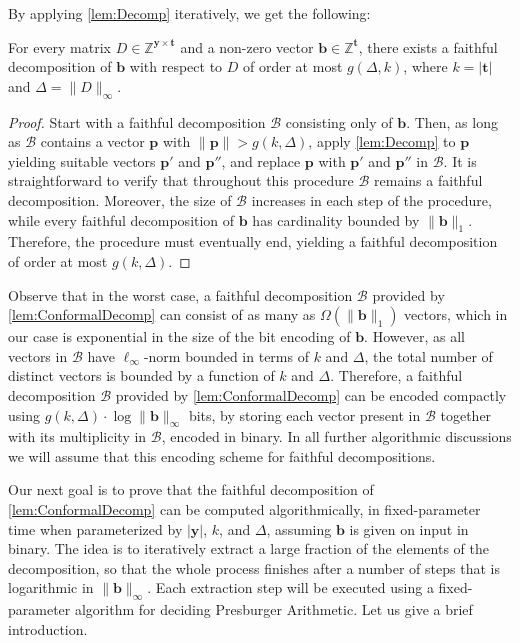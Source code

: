 \documentclass{article}
\newcommand{\Bb}{\mathcal{B}}
\newcommand{\Z}{\mathbb{Z}}
\newcommand{\tup}[1]{{\mathbf{#1}}}
\newcommand{\yy}{\tup y}
\newcommand{\tv}{\tup t}
\newcommand{\bb}{\tup b}
\newcommand{\pp}{\tup p}
\newcommand{\matrices}[3]{#1^{#2\times #3}}
\begin{document}
By applying \cref{lem:Decomp} iteratively, we get the following:

\begin{lemma}\label{lem:ConformalDecomp}
For every matrix $D\in \matrices{\Z}{\yy}{\tv}$ and a non-zero vector $\bb\in \Z^{\tv}$, there exists a faithful decomposition of $\bb$ with respect to $D$ of order at most $g(\Delta,k)$, where $k=|\tv|$ and $\Delta=\|D\|_\infty$.
\end{lemma}
\begin{proof}
Start with a faithful decomposition $\Bb$ consisting only of $\bb$. Then, as long as $\Bb$ contains a vector $\pp$ with $\|\pp\|>g(k,\Delta)$, apply \cref{lem:Decomp} to $\pp$ yielding suitable vectors $\pp'$ and $\pp''$, and replace $\pp$ with $\pp'$ and $\pp''$ in $\Bb$. It is straightforward to verify that throughout this procedure $\Bb$ remains a faithful decomposition. Moreover, the size of $\Bb$ increases in each step of the procedure, while every faithful decomposition of $\bb$ has cardinality bounded by $\|\bb\|_1$. Therefore, the procedure must eventually end, yielding a faithful decomposition of order at most $g(k,\Delta)$.
\end{proof}

Observe that in the worst case, a faithful decomposition $\Bb$ provided by \cref{lem:ConformalDecomp} can consist of as many as $\Omega(\|\bb\|_1)$ vectors, which in our case is exponential in the size of the bit encoding of $\bb$. However, as all vectors in $\Bb$ have $\ell_\infty$-norm bounded in terms of $k$ and $\Delta$, the total number of distinct vectors is bounded by a function of $k$ and $\Delta$. Therefore, a faithful decomposition $\Bb$ provided by \cref{lem:ConformalDecomp} can be encoded compactly using $g(k,\Delta)\cdot \log \|\bb\|_\infty$ bits, by storing each vector present in $\Bb$ together with its multiplicity in $\Bb$, encoded in binary. In all further algorithmic discussions we will assume that this encoding scheme for faithful decompositions.

Our next goal is to prove that the faithful decomposition of \cref{lem:ConformalDecomp} can be computed algorithmically, in fixed-parameter time when parameterized by $|\yy|$, $k$, and $\Delta$, assuming $\bb$ is given on input in binary. The idea is to iteratively extract a large fraction of the elements of the decomposition, so that the whole process finishes after a number of steps that is logarithmic in $\|\bb\|_\infty$. Each extraction step will be executed using a fixed-parameter algorithm for deciding Presburger Arithmetic. Let us give a brief introduction.
\end{document}
